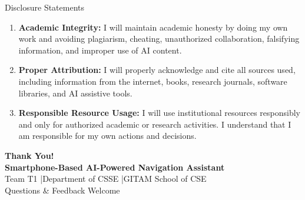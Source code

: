 \begin{frame}{Disclosure Statements}
\begin{enumerate}
    \setlength\itemsep{8pt}
    \item \textbf{Academic Integrity:} I will maintain academic honesty by doing my own work and avoiding plagiarism, cheating, unauthorized collaboration, falsifying information, and improper use of AI content.
    \item \textbf{Proper Attribution:} I will properly acknowledge and cite all sources used, including information from the internet, books, research journals, software libraries, and AI assistive tools.
    \item \textbf{Responsible Resource Usage:} I will use institutional resources responsibly and only for authorized academic or research activities. I understand that I am responsible for my own actions and decisions.
\end{enumerate}
\end{frame}

\begin{frame}
\centering
\vspace{1.5cm}
{\Huge\textbf{\textcolor{MyUnivGreen}{Thank You!}}}\\[1cm]
{\large\textbf{Smartphone-Based AI-Powered Navigation Assistant}}\\[6pt]
{\normalsize Team T1 \quad|\quad Department of CSSE \quad|\quad GITAM School of CSE}\\[12pt]
{\small Questions \& Feedback Welcome}
\end{frame}
